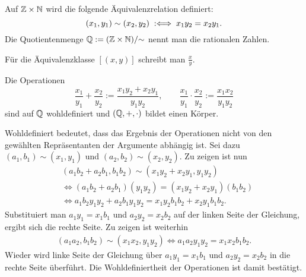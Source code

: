 \begin{Definition}
Auf $\mathbb Z\times\mathbb N$ wird die folgende Äquivalenzrelation definiert:
\[(x_1,y_1)\sim (x_2,y_2) \;:\Longleftrightarrow\; x_1y_2 = x_2y_1.\]
Die Quotientenmenge $\mathbb Q := (\mathbb Z\times\mathbb N)/{\sim}$ nennt man
die rationalen Zahlen.
\end{Definition}
Für die Äquivalenzklasse $[(x,y)]$ schreibt man $\frac{x}{y}$.

\begin{Satz}
Die Operationen
\[\frac{x_1}{y_1}+\frac{x_2}{y_2} := \frac{x_1y_2+x_2y_1}{y_1y_2},
\qquad\frac{x_1}{y_1}\cdot \frac{x_2}{y_2} := \frac{x_1x_2}{y_1y_2}\]
sind auf $\mathbb Q$ wohldefiniert und $(\mathbb Q,+,\cdot)$ bildet einen Körper.
\end{Satz}
 Wohldefiniert bedeutet, dass das Ergebnis der
Operationen nicht von den gewählten Repräsentanten der Argumente
abhängig ist. Sei dazu $(a_1,b_1)\sim (x_1,y_1)$ und
$(a_2,b_2)\sim (x_2,y_2)$. Zu zeigen ist nun
\begin{align*}
&(a_1b_2+a_2b_1,b_1b_2)\sim (x_1y_2+x_2y_1,y_1y_2)\\
&\iff (a_1b_2+a_2b_1)(y_1y_2) = (x_1y_2+x_2y_1)(b_1b_2)\\
&\iff a_1b_2 y_1y_2 + a_2b_1y_1y_2 = x_1y_2b_1b_2+x_2y_1b_1b_2.
\end{align*}
Substituiert man $a_1y_1=x_1b_1$ und $a_2y_2=x_2b_2$ auf
der linken Seite der Gleichung, ergibt sich die rechte Seite.
Zu zeigen ist weiterhin
\begin{align*}
(a_1a_2,b_1b_2)\sim (x_1x_2,y_1y_2)
\iff a_1a_2y_1y_2 = x_1x_2b_1b_2.
\end{align*}
Wieder wird linke Seite der Gleichung über $a_1y_1=x_1b_1$
und $a_2y_2=x_2b_2$ in die rechte Seite überführt.
Die Wohldefiniertheit der Operationen ist damit bestätigt.


